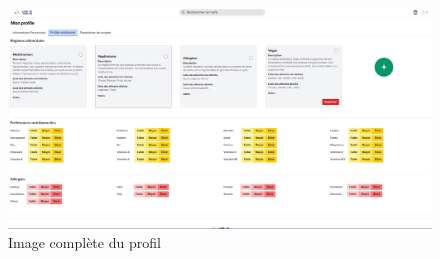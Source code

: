 \documentclass[11pt]{article}
\begin{document}
\begin{figure}[H]
\includegraphics[scale=0.35]{images/full_profile.png}
\caption{Image complète du profil}
\end{figure}
 
\end{document}
